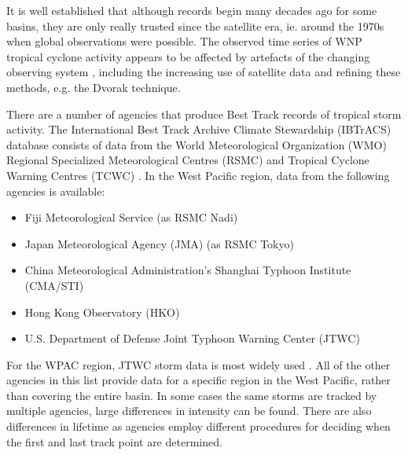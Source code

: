 
It is well established that although records begin many decades ago for some basins, they are only really trusted since the satellite era, ie. around the 1970s \citep{landsea2007counting} when global observations were possible. The observed time series of WNP tropical cyclone activity appears to be affected by artefacts of the changing observing system  \citep{lander1994exploratory, knapp2013pressure}, including the increasing use of satellite data and refining these methods, e.g. the Dvorak technique.

There are a number of agencies that produce Best Track records of tropical storm activity. The  International Best Track Archive Climate Stewardship (IBTrACS)\citep{knapp2010international} database consists of data from the World Meteorological Organization (WMO) Regional Specialized Meteorological Centres (RSMC) and Tropical Cyclone Warning Centres (TCWC) \citep{knapp2010international}. In the West Pacific region, data from the following agencies is available:

\begin{itemize}
	\item Fiji Meteorological Service (as RSMC Nadi)
	\item Japan Meteorological Agency (JMA) (as RSMC Tokyo)
	\item China Meteorological Administration’s Shanghai Typhoon Institute (CMA/STI)
	\item Hong Kong Observatory (HKO)
	\item U.S. Department of Defense Joint Typhoon Warning Center (JTWC)
\end{itemize}

For the WPAC region, JTWC storm data is most widely used \citep{knapp2010international}. All of the other agencies in this list provide data for a specific region in the West Pacific, rather than covering the entire basin. In some cases the same storms are tracked by multiple agencies, large differences in intensity can be found. There are also differences in lifetime as agencies employ different procedures for deciding when the first and last track point are determined.



